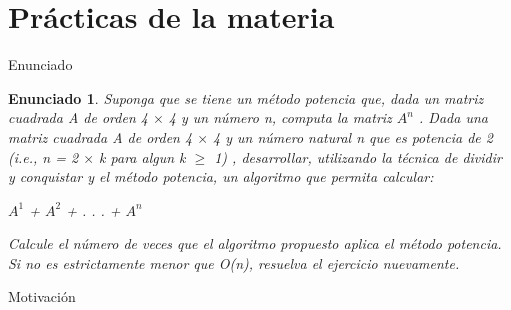 \documentclass[pdf]{beamer}
\newtheorem{enun}{Enunciado}
\begin{document}
\section{Prácticas de la materia} 

\begin{frame}{Enunciado}

\begin{enun}
    Suponga que se tiene un método potencia que, dada un matriz cuadrada A de orden 4 $\times$ 4 
    y un número n, computa la matriz $A^n$ . 
    Dada una matriz cuadrada A de orden 4 $\times$ 4 y un número natural n que es potencia de 2 
    (i.e., n = 2 $\times$ k para algun k $\geq$ 1)
    , desarrollar, utilizando la técnica de dividir y conquistar y el método potencia,
un algoritmo que permita calcular: 

$A^1$ + $A^2$ + . . . + $A^n$

Calcule el número de veces que el algoritmo propuesto aplica el método potencia. Si no es estrictamente menor que O(n), 
resuelva el ejercicio nuevamente.
\end{enun}

\end{frame}

\begin{frame}{Motivación}
    
\end{frame}
\end{document}
